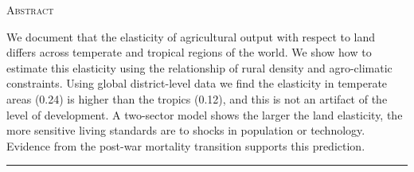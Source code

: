 \documentclass[11pt]{article}
\begin{document}
\begin{titlepage}
\vspace{2in} \noindent {\large \today}

\vspace{.5in} 





\vfill \noindent \textsc{Abstract} \hrulefill

\vspace{.05in} \noindent We document that the elasticity of agricultural output with respect to land differs across temperate and tropical regions of the world. We show how to estimate this elasticity using the relationship of rural density and agro-climatic constraints. Using global district-level data we find the elasticity in temperate areas (0.24) is higher than the tropics (0.12), and this is not an artifact of the level of development. A two-sector model shows the larger the land elasticity, the more sensitive living standards are to shocks in population or technology. Evidence from the post-war mortality transition supports this prediction.
 
\vspace{.1in} \hrule

\vspace{.5in} 

\vspace{.1in} 

\end{titlepage}
\end{document}
